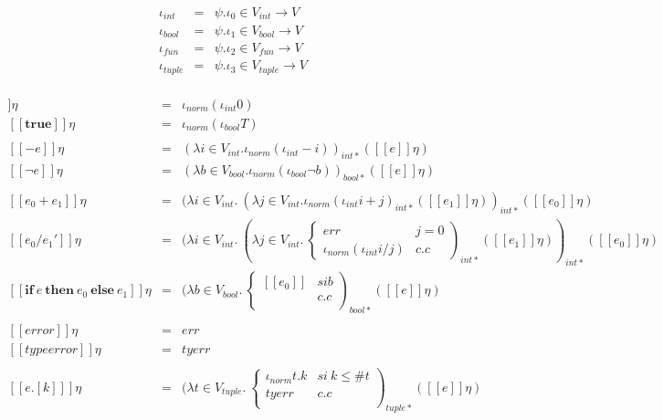 \documentclass[12pt,a4paper]{article}
\newcommand{\se}[1]{[\![#1]\!]}
\newcommand{\IF}[3]{\textbf{if} \ #1 \ \textbf{then} \ #2 \ \textbf{else} \ #3}
\begin{document}
      \begin{eqnarray*}
        \iota_{int} &=& \psi . \iota_{0} \in V_{int} \rightarrow V \\
        \iota_{bool} &=& \psi . \iota_{1} \in V_{bool} \rightarrow V \\
        \iota_{fun} &=& \psi . \iota_{2} \in V_{fun} \rightarrow V \\
        \iota_{tuple} &=& \psi . \iota_{3} \in V_{tuple} \rightarrow V \\
      \end{eqnarray*}

      \begin{eqnarray*}
        \se{0}\eta &=& \iota_{norm}(\iota_{int} 0) \\
        \se{\textbf{true}}\eta &=& \iota_{norm}(\iota_{bool} T) \\ \\
        \se{-e}\eta &=& (\lambda i \in V_{int}. \iota_{norm}(\iota_{int} -i))_{int*}(\se{e}\eta) \\
        \se{\neg e}\eta &=& (\lambda b \in V_{bool}. \iota_{norm}(\iota_{bool} \neg b))_{bool*}(\se{e}\eta) \\ \\
        \se{e_0+e_1}\eta &=& (\lambda i \in V_{int}.\ (\lambda j \in V_{int}. \iota_{norm}(\iota_{int} i+j)_{int*}(\se{e_1}\eta))_{int*}(\se{e_0}\eta) \\
        \se{e_0/e_1'}\eta &=& (\lambda i \in V_{int}. \ (\lambda j \in V_{int}. \ \left\lbrace 
        \begin{array}{lll}
          err & j = 0 \\
          \iota_{norm}(\iota_{int} i/j) & c.c
        \end{array}\right)_{int*} (\se{e_1}\eta))_{int*} (\se{e_0}\eta) \\
        \se{\IF{e}{e_0}{e_1}}\eta &=& (\lambda b \in V_{bool}. \ \left\lbrace 
        \begin{array}{lll}
          \se{e_0} & si b \\
          \se{e_1} & c.c \\
        \end{array}\right)_{bool*} (\se{e}\eta) \\ \\
        \se{error}\eta &=& err \\
        \se{typeerror}\eta &=& tyerr \\ \\
        \se{e.[k]}\eta &=& (\lambda t \in V_{tuple}. \ \left\lbrace 
        \begin{array}{lll}
          \iota_{norm} t.k & si \ k \leq \# t \\
          tyerr & c.c \\
        \end{array}\right)_{tuple*} (\se{e}\eta)
      \end{eqnarray*}
\end{document}
